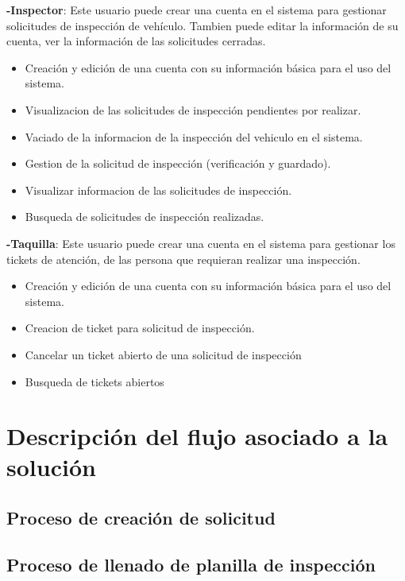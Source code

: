 \textbf{-Inspector}: Este usuario puede crear una cuenta en el sistema para gestionar solicitudes de inspección de vehículo. Tambien puede editar la información de su cuenta, ver la información de las solicitudes cerradas. 
	\begin{itemize}
		\item Creación y edición de una cuenta con su información básica para el uso del sistema.
		\item Visualizacion de las solicitudes de inspección pendientes por realizar.
		\item Vaciado de la informacion de la inspección del vehiculo en el sistema.
		\item Gestion de la solicitud de inspección (verificación y guardado). 
		\item Visualizar informacion de las solicitudes de inspección.
		\item Busqueda de solicitudes de inspección realizadas.
	\end{itemize}

\textbf{-Taquilla}: Este usuario puede crear una cuenta en el sistema para gestionar los tickets de atención, de las persona que requieran realizar una inspección.
	\begin{itemize}
		\item Creación y edición de una cuenta con su información básica para el uso del sistema.
		\item Creacion de ticket para solicitud de inspección.
		\item Cancelar un ticket abierto de una solicitud de inspección 
		\item Busqueda de tickets abiertos
	\end{itemize}


\setlength{\parskip}{0mm}


\section{Descripción del flujo asociado a la solución} 
\setlength{\parskip}{5mm}
\setlength{\parskip}{0mm}

\subsection{Proceso de creación de solicitud}
\setlength{\parskip}{5mm}
\setlength{\parskip}{0mm}

\subsection{Proceso de llenado de planilla de inspección}
\setlength{\parskip}{5mm}
\setlength{\parskip}{0mm}

